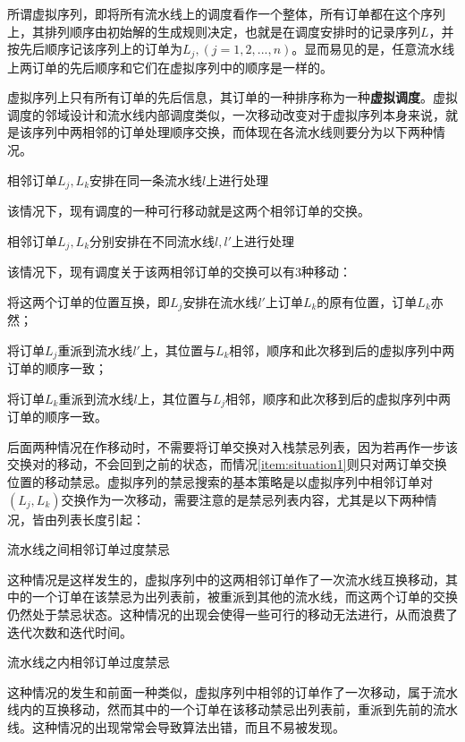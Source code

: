 所谓虚拟序列，即将所有流水线上的调度看作一个整体，所有订单都在这个序列上，其排列顺序由初始解的生成规则决定，也就是在调度安排时的记录序列$L$，并按先后顺序记该序列上的订单为$L_j, (j = 1,2,...,n)$。显而易见的是，任意流水线上两订单的先后顺序和它们在虚拟序列中的顺序是一样的。

虚拟序列上只有所有订单的先后信息，其订单的一种排序称为一种\textbf{虚拟调度}。虚拟调度的邻域设计和流水线内部调度类似，一次移动改变对于虚拟序列本身来说，就是该序列中两相邻的订单处理顺序交换，而体现在各流水线则要分为以下两种情况。
\begin{asparaenum}
\item 相邻订单$L_j, L_k$安排在同一条流水线$l$上进行处理

该情况下，现有调度的一种可行移动就是这两个相邻订单的交换。
\item 相邻订单$L_j, L_k$分别安排在不同流水线$l, l'$上进行处理
\end{asparaenum}

该情况下，现有调度关于该两相邻订单的交换可以有$3$种移动：
\begin{inparaenum}
\renewcommand{\theenumi}{\protect\setcounter{local}{171 + \the\value{enumi}}\protect\ding{\value{local}}}
\renewcommand{\labelenumi}{\theenumi}
\item 将这两个订单的位置互换，即$L_j$安排在流水线$l'$上订单$L_k$的原有位置，订单$L_k$亦然\label{item:situation1}；
\item 将订单$L_j$重派到流水线$l'$上，其位置与$L_k$相邻，顺序和此次移到后的虚拟序列中两订单的顺序一致；
\item 将订单$L_k$重派到流水线$l$上，其位置与$L_j$相邻，顺序和此次移到后的虚拟序列中两订单的顺序一致。
\end{inparaenum}

后面两种情况在作移动时，不需要将订单交换对入栈禁忌列表，因为若再作一步该交换对的移动，不会回到之前的状态，而情况\ref{item:situation1}则只对两订单交换位置的移动禁忌。虚拟序列的禁忌搜索的基本策略是以虚拟序列中相邻订单对$(L_j, L_k)$交换作为一次移动，需要注意的是禁忌列表内容，尤其是以下两种情况，皆由列表长度引起：
\begin{asparaenum}
\item 流水线之间相邻订单过度禁忌

这种情况是这样发生的，虚拟序列中的这两相邻订单作了一次流水线互换移动，其中的一个订单在该禁忌为出列表前，被重派到其他的流水线，而这两个订单的交换仍然处于禁忌状态。这种情况的出现会使得一些可行的移动无法进行，从而浪费了迭代次数和迭代时间。
\item 流水线之内相邻订单过度禁忌
\end{asparaenum}
这种情况的发生和前面一种类似，虚拟序列中相邻的订单作了一次移动，属于流水线内的互换移动，然而其中的一个订单在该移动禁忌出列表前，重派到先前的流水线。这种情况的出现常常会导致算法出错，而且不易被发现。

